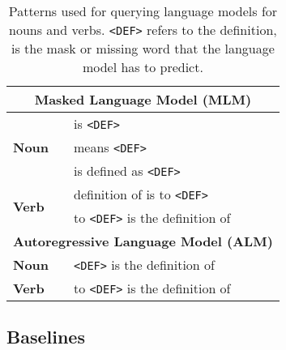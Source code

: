 \documentclass[11pt,a4paper]{article}
\begin{document}
\begin{table}
\centering
\begin{tabular}{ll}
\multicolumn{2}{c}{\textbf{Masked Language Model (MLM)}} \\\hline
\multirow{3}{*}{\textbf{Noun}} & \underline{\hspace{3mm}} is \texttt{<DEF>} \\
 & \underline{\hspace{3mm}} means \texttt{<DEF>}  \\%
& \underline{\hspace{3mm}} is defined as \texttt{<DEF>} \\\hline
 \multirow{2}{*}{\textbf{Verb}} & definition of \underline{\hspace{3mm}} is to \texttt{<DEF>} \\
 & to \texttt{<DEF>} is the definition of \underline{\hspace{3mm}}  \\ \hline\hline
 \multicolumn{2}{c}{\textbf{Autoregressive Language Model (ALM)}}\\ \hline
\multirow{1}{*}{\textbf{Noun}} & \texttt{<DEF>} is the definition of \underline{\hspace{3mm}} \\
  \hline %
 \multirow{1}{*}{\textbf{Verb}} &   to \texttt{<DEF>} is the definition of \underline{\hspace{3mm}} \\
\end{tabular}
\caption{Patterns used for querying language models for
  nouns and verbs.
\texttt{<DEF>} refers to the definition,
\underline{\hspace{3mm}} is the mask or missing word that
the language model has to predict.}
\label{tab:patterns}
\end{table}


\subsection{Baselines}

  
\end{document}
